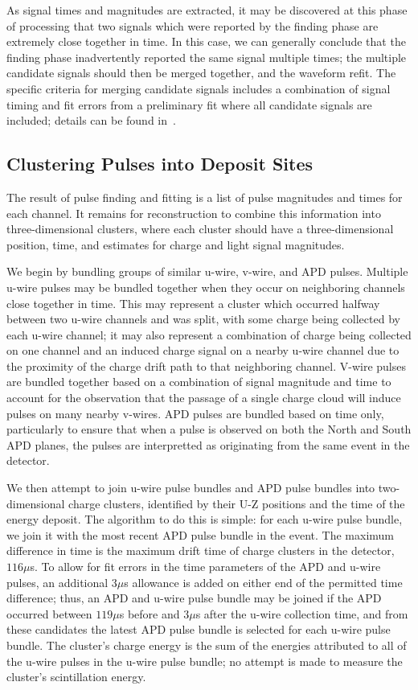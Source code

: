 As signal times and magnitudes are extracted, it may be discovered at this phase of processing that two signals which were reported by the finding phase are extremely close together in time.  In this case, we can generally conclude that the finding phase inadvertently reported the same signal multiple times; the multiple candidate signals should then be merged together, and the waveform refit.  The specific criteria for merging candidate signals includes a combination of signal timing and fit errors from a preliminary fit where all candidate signals are included; details can be found in~\cite{ReconstructionDocument}.

\subsection{Clustering Pulses into Deposit Sites}\label{sec:ReconClustering}

The result of pulse finding and fitting is a list of pulse magnitudes and times for each channel.  It remains for reconstruction to combine this information into three-dimensional clusters, where each cluster should have a three-dimensional position, time, and estimates for charge and light signal magnitudes.

We begin by bundling groups of similar u-wire, v-wire, and APD pulses.  Multiple u-wire pulses may be bundled together when they occur on neighboring channels close together in time.  This may represent a cluster which occurred halfway between two u-wire channels and was split, with some charge being collected by each u-wire channel; it may also represent a combination of charge being collected on one channel and an induced charge signal on a nearby u-wire channel due to the proximity of the charge drift path to that neighboring channel.  V-wire pulses are bundled together based on a combination of signal magnitude and time to account for the observation that the passage of a single charge cloud will induce pulses on many nearby v-wires.  APD pulses are bundled based on time only, particularly to ensure that when a pulse is observed on both the North and South APD planes, the pulses are interpretted as originating from the same event in the detector.

We then attempt to join u-wire pulse bundles and APD pulse bundles into two-dimensional charge clusters, identified by their U-Z positions and the time of the energy deposit.  The algorithm to do this is simple: for each u-wire pulse bundle, we join it with the most recent APD pulse bundle in the event.  The maximum difference in time is the maximum drift time of charge clusters in the detector, $116 \mu$s.  To allow for fit errors in the time parameters of the APD and u-wire pulses, an additional $3 \mu$s allowance is added on either end of the permitted time difference; thus, an APD and u-wire pulse bundle may be joined if the APD occurred between $119 \mu$s before and $3 \mu$s after the u-wire collection time, and from these candidates the latest APD pulse bundle is selected for each u-wire pulse bundle.  The cluster's charge energy is the sum of the energies attributed to all of the u-wire pulses in the u-wire pulse bundle; no attempt is made to measure the cluster's scintillation energy.


